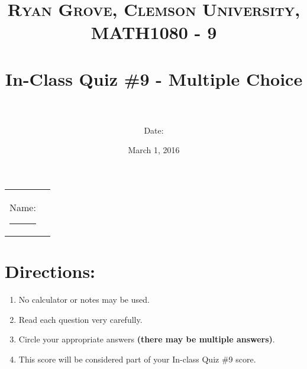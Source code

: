 \documentclass[paper=a4, fontsize=11pt]{scrartcl} %
\title{	
\normalfont \normalsize 
\textsc{Ryan Grove, Clemson University, MATH1080 - 9} \\ [25pt] %
\horrule{0.5pt} \\[0.4cm] %
\huge In-Class Quiz \#9 - Multiple Choice \\ %
\horrule{2pt} \\[0.5cm] %
}
\author{Date:} %
\date{\normalsize March 1, 2016} %
\numberwithin{equation}{section} %
\numberwithin{figure}{section} %
\numberwithin{table}{section} %
\begin{document}
\maketitle %

\begin{flushleft}
\begin{tabular}{l l}
Name: \rule{3.2in}{.01cm}  & {}%
\end{tabular}
\end{flushleft}


\section*{\textbf{Directions:}}
\begin{enumerate}
\item No calculator or notes may be used.
\item Read each question very carefully.
\item Circle your appropriate answers \textbf{(there may be multiple answers)}.
\item This score will be considered part of your In-class Quiz \#9 score.
\end{enumerate}
    \vspace{0.5in}
\newpage
\end{document}
